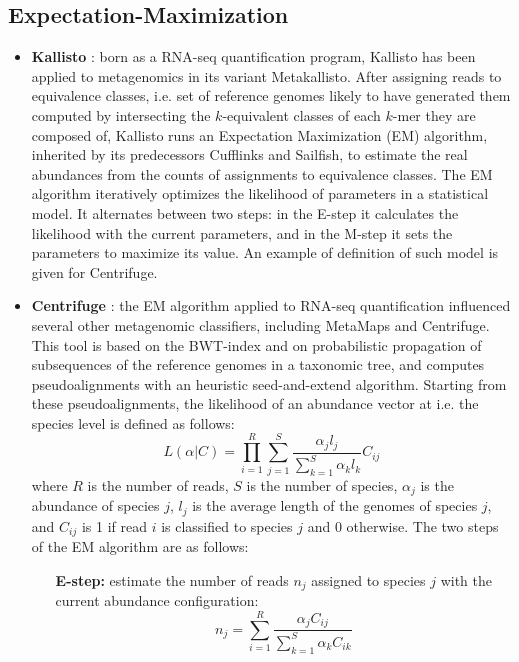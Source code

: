 \subsection{Expectation-Maximization}
\begin{itemize}
    \item \textbf{Kallisto} \cite{bray_near-optimal_2016}: born as a RNA-seq quantification program, Kallisto has been applied to metagenomics in its variant Metakallisto. After assigning reads to equivalence classes, i.e. set of reference genomes likely to have generated them computed by intersecting the $k$-equivalent classes of each $k$-mer they are composed of, Kallisto runs an Expectation Maximization (EM) algorithm, inherited by its predecessors Cufflinks and Sailfish, to estimate the real abundances from the counts of assignments to equivalence classes. The EM algorithm iteratively optimizes the likelihood of parameters in a statistical model. It alternates between two steps: in the E-step it calculates the likelihood with the current parameters, and in the M-step it sets the parameters to maximize its value. An example of definition of such model is given for Centrifuge.
    \item \textbf{Centrifuge} \cite{kim_centrifuge:_2016}: the EM algorithm applied to RNA-seq quantification influenced several other metagenomic classifiers, including MetaMaps \cite{dilthey_metamaps_2018} and Centrifuge. This tool is based on the BWT-index and on probabilistic propagation of subsequences of the reference genomes in a taxonomic tree, and computes pseudoalignments with an heuristic seed-and-extend algorithm. Starting from these pseudoalignments, the likelihood of an abundance vector at i.e. the species level is defined as follows:
    \begin{equation*}
      L(\alpha|C) = \prod_{i=1}^R \sum_{j=1}^S \frac{\alpha_j l_j}{\sum_{k=1}^S \alpha_k l_k} C_{ij}
    \end{equation*}
    where $R$ is the number of reads, $S$ is the number of species, $\alpha_j$ is the abundance of species $j$, $l_j$ is the average length of the genomes of species $j$, and $C_{ij}$ is 1 if read $i$ is classified to species $j$ and 0 otherwise. The two steps of the EM algorithm are as follows:
    \begin{itemize}
      \item[\textbf{E-step:}] estimate the number of reads $n_j$ assigned to species $j$ with the current abundance configuration:
      \begin{equation*}
        n_j = \sum_{i=1}^R \frac{\alpha_j C_{ij}}{\sum_{k=1}^S \alpha_k C_{ik}}

\end{equation*}
\end{itemize}
\end{itemize}
